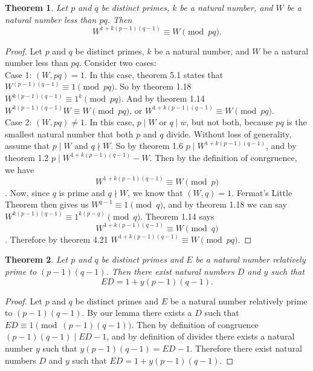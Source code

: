 \documentclass[12pt,leqno]{article}
\numberwithin{equation}{section}
\newtheorem{thm}{Theorem}[section]
\theoremstyle{definition}
\begin{document}
\begin{thm}
Let $p$ and $q$ be distinct primes, $k$ be a natural number, and $W$
be a natural number less than $pq$. Then
\[W^{1+k(p-1)(q-1)}\equiv W\pmod{pq}.\]
\end{thm}
\begin{proof}[Proof]
Let $p$ and $q$ be distinct primes, $k$ be a natural number, and $W$ be a natural number less than $pq$.  Consider two cases:\\

Case 1: $(W, pq) = 1$.  In this case, theorem 5.1 states that $W^{(p-1)(q-1)}\equiv 1 \pmod{pq}$.  So by theorem 1.18 $W^{k(p-1)(q-1)}\equiv 1^k \pmod{pq}$.  And by theorem 1.14 $W^{k(p-1)(q-1)}W \equiv W \pmod{pq}$, or $W^{1+k(p-1)(q-1)}\equiv W\pmod{pq}$.\\

Case 2: $(W, pq) \neq 1$.  In this case, $p \mid W$ or $q \mid w$, but not both, because $pq$ is the smallest natural number that both $p$ and $q$ divide.  Without loss of generality, assume that $p \mid W$ and $q \nmid W$. So by theorem 1.6 $p \mid W^{1+k(p-1)(q-1)}$, and by theorem 1.2 $p \mid W^{1+k(p-1)(q-1)} - W$.  Then by the definition of conrgruence, we have \[W^{1+k(p-1)(q-1)}\equiv W\pmod{p}\].  Now, since $q$ is prime and $q \nmid W$, we know that $(W, q) = 1$.  Fermat's Little Theorem then gives us $W^{q-1} \equiv 1 \pmod{q}$, and by theorem 1.18 we can say $W^{k(p-1)(q-1)}\equiv 1^{k(p-q)} \pmod{q}$.  Theorem 1.14 says \[W^{1+k(p-1)(q-1)}\equiv W\pmod{q}\].  Therefore by theorem 4.21 $W^{1+k(p-1)(q-1)}\equiv W\pmod{pq}$.
\end{proof}

\pagebreak
\begin{thm}
Let $p$ and $q$ be distinct primes and $E$ be a natural number
relatively prime to $(p-1)(q-1)$. Then there exist natural numbers
$D$ and $y$ such that
\[ED = 1+y(p-1)(q-1).\]
\end{thm}
\begin{proof}[Proof]
Let $p$ and $q$ be distinct primes and $E$ be a natural number relatively prime to $(p-1)(q-1)$.  By our lemma there exists a $D$ such that $ED \equiv 1 \pmod{(p-1)(q-1)}$.  Then by definition of congruence $(p-1)(q-1) \mid ED - 1$, and by definition of divides there exists a natural number $y$ such that $y(p-1)(q-1) = ED - 1$. Therefore there exist natural numbers $D$ and $y$ such that $ED = 1+y(p-1)(q-1)$.
\end{proof}
\end{document}
